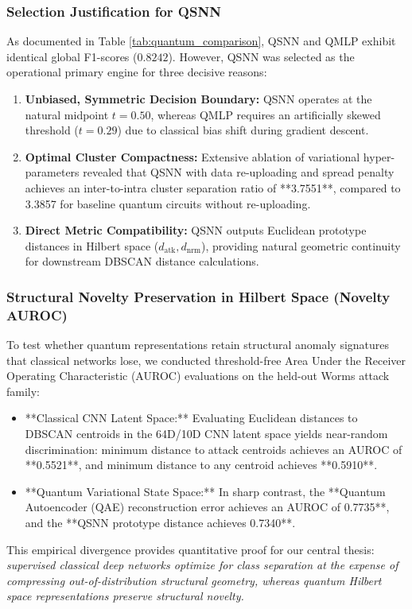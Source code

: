\documentclass[preprint,12pt]{elsarticle}
\begin{document}
\subsubsection{Selection Justification for QSNN}
As documented in Table \ref{tab:quantum_comparison}, QSNN and QMLP exhibit identical global F1-scores ($0.8242$). However, QSNN was selected as the operational primary engine for three decisive reasons:
\begin{enumerate}
    \item \textbf{Unbiased, Symmetric Decision Boundary:} QSNN operates at the natural midpoint $t = 0.50$, whereas QMLP requires an artificially skewed threshold ($t = 0.29$) due to classical bias shift during gradient descent.
    \item \textbf{Optimal Cluster Compactness:} Extensive ablation of variational hyper-parameters revealed that QSNN with data re-uploading and spread penalty achieves an inter-to-intra cluster separation ratio of **3.7551**, compared to 3.3857 for baseline quantum circuits without re-uploading.
    \item \textbf{Direct Metric Compatibility:} QSNN outputs Euclidean prototype distances in Hilbert space ($d_{\text{atk}}, d_{\text{nrm}}$), providing natural geometric continuity for downstream DBSCAN distance calculations.
\end{enumerate}

\subsubsection{Structural Novelty Preservation in Hilbert Space (Novelty AUROC)}
To test whether quantum representations retain structural anomaly signatures that classical networks lose, we conducted threshold-free Area Under the Receiver Operating Characteristic (AUROC) evaluations on the held-out Worms attack family:
\begin{itemize}
    \item **Classical CNN Latent Space:** Evaluating Euclidean distances to DBSCAN centroids in the 64D/10D CNN latent space yields near-random discrimination: minimum distance to attack centroids achieves an AUROC of **0.5521**, and minimum distance to any centroid achieves **0.5910**.
    \item **Quantum Variational State Space:** In sharp contrast, the **Quantum Autoencoder (QAE) reconstruction error achieves an AUROC of 0.7735**, and the **QSNN prototype distance achieves 0.7340**.
\end{itemize}
This empirical divergence provides quantitative proof for our central thesis: \textit{supervised classical deep networks optimize for class separation at the expense of compressing out-of-distribution structural geometry, whereas quantum Hilbert space representations preserve structural novelty.}
\end{document}
